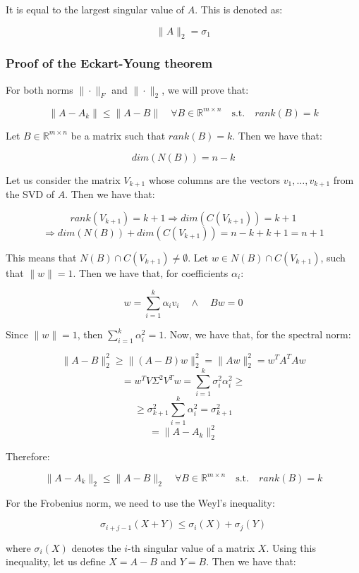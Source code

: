 It is equal to the largest singular value of $A$. This is denoted as:

\begin{equation}
    \|A\|_2 = \sigma_1
\end{equation}

\subsubsection{Proof of the Eckart-Young theorem}

For both norms $\| \cdot \|_F$ and $\| \cdot \|_2$, we will prove that:

$$\| A - A_k \| \leq \| A - B \| \quad \forall B \in \mathbb{R}^{m \times n} \quad \text{s.t.} \quad rank(B) = k$$

Let $B \in \mathbb{R}^{m \times n}$ be a matrix such that $rank(B) = k$. Then we have that:

$$dim(N(B)) = n - k$$

Let us consider the matrix $V_{k+1}$ whose columns are the vectors $v_{1}, \ldots, v_{k+1}$ 
from the SVD of $A$. Then we have that:

$$rank(V_{k+1}) = k+1 \Rightarrow dim(C(V_{k+1})) = k + 1$$
$$\Rightarrow dim(N(B)) + dim(C(V_{k+1})) = n - k + k + 1 = n + 1$$


This means that $N(B) \cap C(V_{k+1}) \neq \emptyset$. Let $w \in N(B) \cap C(V_{k+1})$, 
such that $\|w\| = 1$. Then we have that, for coefficients $\alpha_i$:

$$w = \sum_{i=1}^k \alpha_i v_i \quad \wedge \quad B w = 0$$

Since $\|w\| = 1$, then $\sum_{i=1}^k \alpha_i^2 = 1$. Now, we have that, for the 
spectral norm:

$$\|A - B\|_2^2 \geq \|(A - B) w\|_2^2 = \|A w\|_2^2 = w^T A^T A w$$
$$= w^T V \Sigma^2 V^T w = \sum_{i=1}^k \sigma_i^2 \alpha_i^2 \geq$$
$$\geq \sigma_{k+1}^2 \sum_{i=1}^k \alpha_i^2 = \sigma_{k+1}^2$$
$$= \|A - A_k\|_2^2$$

Therefore:

$$\|A - A_k\|_2 \leq \|A - B\|_2 \quad \forall B \in \mathbb{R}^{m \times n} \quad \text{s.t.} \quad rank(B) = k$$

For the Frobenius norm, we need to use the Weyl's inequality:

\begin{equation}
    \sigma_{i + j - 1}(X + Y) \leq \sigma_i(X) + \sigma_j(Y)
\end{equation}

where $\sigma_i(X)$ denotes the $i$-th singular value of a matrix $X$. Using this inequality, 
let us define $X = A - B$ and $Y = B$. Then we have that:

